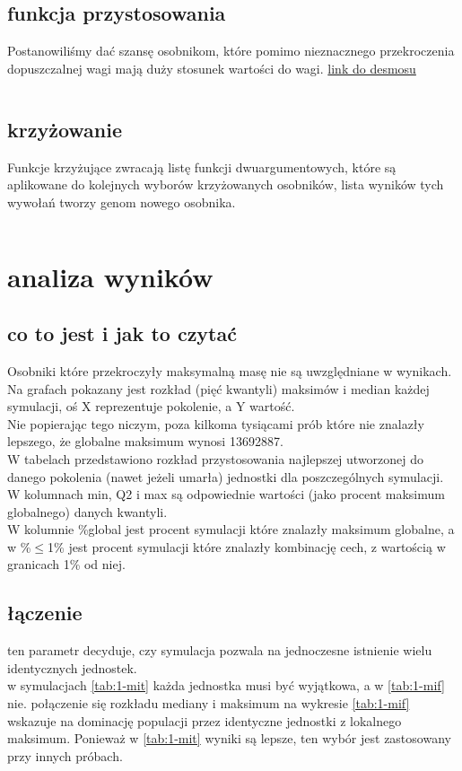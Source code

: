 \documentclass{article}
\begin{document}
\subsection{funkcja przystosowania}
Postanowiliśmy dać szansę osobnikom, które pomimo nieznacznego przekroczenia dopuszczalnej
wagi mają duży stosunek wartości do wagi.
\href{https://www.desmos.com/calculator/gikud1m6v8}{link do desmosu}
\inputminted{clojure}{snippets/alg.clj_scoring}
\subsection{krzyżowanie}
Funkcje krzyżujące zwracają listę funkcji dwuargumentowych, które są aplikowane
do kolejnych wyborów krzyżowanych osobników, lista wyników tych wywołań tworzy
genom nowego osobnika.
\inputminted{clojure}{snippets/alg.clj_krzyżowanie}



\section{analiza wyników}
\subsection{co to jest i jak to czytać}
Osobniki które przekroczyły maksymalną masę nie są uwzględniane w wynikach.
\\
Na grafach pokazany jest rozkład (pięć kwantyli) maksimów i median każdej
symulacji, oś X reprezentuje pokolenie, a Y wartość.
\\
Nie popierając tego niczym, poza kilkoma tysiącami prób które nie znalazły
lepszego, że globalne maksimum wynosi 13692887.
\\
W tabelach przedstawiono rozkład przystosowania najlepszej utworzonej do danego pokolenia
(nawet jeżeli umarła) jednostki dla poszczególnych symulacji.
\\
W kolumnach min, Q2 i max są odpowiednie wartości (jako procent maksimum
globalnego) danych kwantyli.
\\
W kolumnie \%global jest procent symulacji które znalazły maksimum globalne, a
w \%$\le$1\% jest procent symulacji które znalazły kombinację cech, z wartością w
granicach 1\% od niej.

\subsection{łączenie}
ten parametr decyduje, czy symulacja pozwala na jednoczesne istnienie wielu
identycznych jednostek.\\
w symulacjach \ref{tab:1-mit} każda jednostka musi być wyjątkowa, a w
\ref{tab:1-mif} nie. połączenie się rozkładu mediany i maksimum na wykresie
\ref{tab:1-mif} wskazuje na dominację populacji przez identyczne jednostki
z lokalnego maksimum. Ponieważ w \ref{tab:1-mit} wyniki są lepsze, ten wybór
jest zastosowany przy innych próbach.
\end{document}
